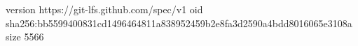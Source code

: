 version https://git-lfs.github.com/spec/v1
oid sha256:bb5599400831cd1496464811a838952459b2e8fa3d2590a4bdd8016065e3108a
size 5566
